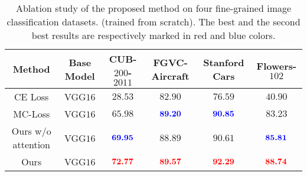 \documentclass[journal]{IEEEtran}
\def\tblue#1{\textcolor[rgb]{0,0,1}{#1}} %
\def\tred#1{\textcolor[rgb]{1,0,0}{#1}}  %
\begin{document}
\begin{table*}[!t]
  \centering
  \small
  \caption{Ablation study of the proposed method on four fine-grained image classification datasets. (trained from scratch). The best and the second best results are respectively marked in red and blue colors.}
      \begin{adjustbox}{width=0.8\linewidth,center}
   \Huge   %
    \begin{tabular}{|c|c|c|c|c|c|}
    \toprule
    Method     & Base Model             & CUB-$200$-$2011$   & FGVC-Aircraft      & Stanford Cars     & Flowers-$102$ \\
    \midrule
    \midrule
    CE Loss & VGG$16$ & $28.53$ & $82.90$  & $76.59$ &$ 40.90$ \\
    MC-Loss & VGG$16$ & $65.98$ & $\textbf{\tblue{89.20}}$  & $\textbf{\tblue{90.85}}$ & $83.23$ \\
    Ours w/o attention & VGG$16$ &$ \textbf{\tblue{69.95}}$ & $88.89$ &$ 90.61$ &$ \textbf{\tblue{85.81}}$ \\
    Ours  & VGG$16$ & $\textbf{\tred{72.77}} $& $\textbf{\tred{89.57}}$ &$ \textbf{\tred{92.29}}$ &$ \textbf{\tred{88.74}}$ \\
    \bottomrule
    \end{tabular}%
               \end{adjustbox}
  \label{tab:ablation_1}%
\end{table*}%
\end{document}
